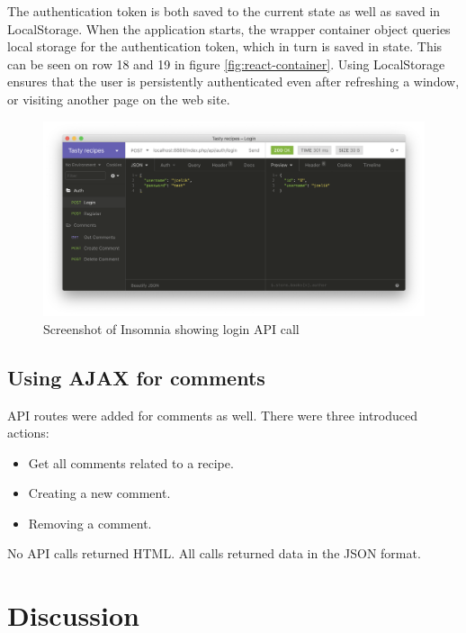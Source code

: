 \documentclass[a4paper]{scrartcl}
\begin{document}
The authentication token is both saved to the current state as well as saved in LocalStorage. When the application starts, the wrapper container object queries local storage for the authentication token, which in turn is saved in state. This can be seen on row 18 and 19 in figure \ref{fig:react-container}. Using LocalStorage ensures that the user is persistently authenticated even after refreshing a window, or visiting another page on the web site.

\begin{figure}
	\begin{center}
		\includegraphics[width=\linewidth]{images/screenshot-insomnia-login.png}
		\caption{Screenshot of Insomnia showing login API call}
		\label{fig:api-login}
	\end{center}
\end{figure}

\newpage
\subsection{Using AJAX for comments}

API routes were added for comments as well. There were three introduced actions:

\begin{itemize}
\item Get all comments related to a recipe.
\item Creating a new comment.
\item Removing a comment.
\end{itemize}

\noindent
No API calls returned HTML. All calls returned data in the JSON format.

\section{Discussion}
\end{document}
